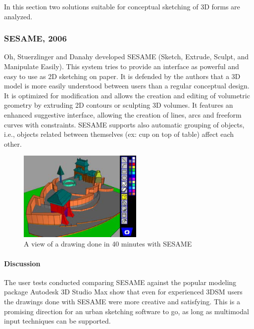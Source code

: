 
In this section two solutions suitable for conceptual sketching of 3D forms are analyzed.

\subsubsection{SESAME, 2006}

Oh, Stuerzlinger and Danahy \cite{SESAME3D} developed SESAME (Sketch, Extrude, Sculpt, and Manipulate Easily).
This system tries to provide an interface as powerful and easy to use as 2D sketching on paper.
It is defended by the authors that a 3D model is more easily understood between users than a regular conceptual
design.
It is optimized for modification and allows the creation and editing of volumetric geometry by extruding 2D
contours or sculpting 3D volumes.
It features an enhanced suggestive interface, allowing the creation of lines, arcs and freeform curves with
constraints.
SESAME supports also automatic grouping of objects, i.e., objects related
between themselves (ex: cup on top of table) affect each other.

\begin{figure}[!ht]
	\centering
	\includegraphics[width=6cm]{gfx/sesame.png}
	\caption{A view of a drawing done in 40 minutes with SESAME}
	\label{FIG-SESAME}
\end{figure}

\paragraph{Discussion}
\label{sec:Paragraph}

The user tests conducted comparing SESAME against the popular modeling package Autodesk 3D Studio Max
show that even for experienced 3DSM users the drawings done with SESAME were more creative and satisfying.
This is a promising direction for an urban sketching software to go, as long as multimodal input techniques
can be supported.



